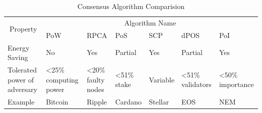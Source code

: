\documentclass{IEEEtran}
\begin{document}
      \begin{table}
        \caption{Consensus Algorithm Comparision}
        \label{tab:tab1}
        \center
        \begin{tabular}{|l|llllll|}
          \hline
          \multicolumn{1}{|c|}{\multirow{2}{*}{Property}} & \multicolumn{6}{c|}{Algorithm Name}                                                                                                                                                                                                                                  \\ \cline{2-7} 
          \multicolumn{1}{|c|}{}                          & \multicolumn{1}{l|}{PoW}                             & \multicolumn{1}{l|}{RPCA}                         & \multicolumn{1}{l|}{PoS}                   & \multicolumn{1}{l|}{SCP}      & \multicolumn{1}{l|}{dPOS}                       & PoI                        \\ \hline
          Energy Saving                                   & \multicolumn{1}{l|}{No}                              & \multicolumn{1}{l|}{Yes}                          & \multicolumn{1}{l|}{Partial}               & \multicolumn{1}{l|}{Yes}      & \multicolumn{1}{l|}{Partial}                    & Yes                        \\ \hline
          Tolerated power of adversary                    & \multicolumn{1}{l|}{\textless{}25\% computing power} & \multicolumn{1}{l|}{\textless{}20\% faulty nodes} & \multicolumn{1}{l|}{\textless{}51\% stake} & \multicolumn{1}{l|}{Variable} & \multicolumn{1}{l|}{\textless{}51\% validators} & \textless{}50\% importance \\ \hline
          Example                                         & \multicolumn{1}{l|}{Bitcoin}                         & \multicolumn{1}{l|}{Ripple}                       & \multicolumn{1}{l|}{Cardano}               & \multicolumn{1}{l|}{Stellar}  & \multicolumn{1}{l|}{EOS}                        & NEM                        \\ \hline
        \end{tabular}
      \end{table}
\end{document}

